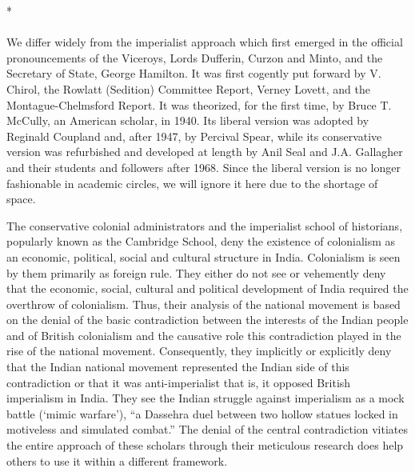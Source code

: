 \begin{multicols}{2}
\begin{center}*\end{center}

\paragraph*{}
We differ widely from the imperialist approach which first emerged in the official pronouncements of the Viceroys, Lords Dufferin, Curzon and Minto, and the Secretary of State, George Hamilton. It was first cogently put forward by V. Chirol, the Rowlatt (Sedition) Committee Report, Verney Lovett, and the Montague-Chelmsford Report. It was theorized, for the first time, by Bruce T. McCully, an American scholar, in 1940. Its liberal version was adopted by Reginald Coupland and, after 1947, by Percival Spear, while its conservative version was refurbished and developed at length by Anil Seal and J.A. Gallagher and their students and followers after 1968. Since the liberal version is no longer fashionable in academic circles, we will ignore it here due to the shortage of space.

The conservative colonial administrators and the imperialist school of historians, popularly known as the Cambridge School, deny the existence of colonialism as an economic, political, social and cultural structure in India. Colonialism is seen by them primarily as foreign rule. They either do not see or vehemently deny that the economic, social, cultural and political development of India required the overthrow of colonialism. Thus, their analysis of the national movement is based on the denial of the basic contradiction between the interests of the Indian people and of British colonialism and the causative role this contradiction played in the rise of the national movement. Consequently, they implicitly or explicitly deny that the Indian national movement represented the Indian side of this contradiction or that it was anti-imperialist that is, it opposed British imperialism in India. They see the Indian struggle against imperialism as a mock battle (`mimic warfare'), ``a Dassehra duel between two hollow statues locked in motiveless and simulated combat.'' The denial of the central contradiction vitiates the entire approach of these scholars through their meticulous research does help others to use it within a different framework.


\end{multicols}
